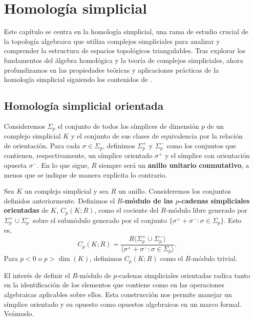 
\chapter{Homología simplicial}

Este capítulo se centra en la homología simplicial, una rama de estudio crucial
de la topología algebraica que utiliza complejos simpliciales para analizar y
comprender la estructura de espacios topológicos triangulables. Tras explorar los
fundamentos del álgebra homológica y la teoría de complejos simpliciales, ahora
profundizamos en las propiedades teóricas y aplicaciones prácticas de la
homología simplicial siguiendo los contenidos de \cite{rafael2003elementos}.

\section{Homología simplicial orientada}
Consideremos \(\Sigma_{p}\) el conjunto de todos los símplices de dimensión \(p\) de
un complejo simplicial \(K\) y el conjunto de sus clases de equivalencia por la relación de orientación. Para cada \(\sigma \in \Sigma_{p}\), definimos
\(\Sigma_{p}^{+}\) y \(\Sigma_{p}^{-}\) como los conjuntos que contienen, respectivamente,
un símplice orientado \(\sigma^{+}\) y el símplice con orientación opuesta
\(\sigma^{-}\). En lo que sigue, \(R\) siempre será un \textbf{anillo unitario conmutativo}, a menos que se indique de manera explícita lo contrario.

\begin{definicion}
	Sea \(K\) un complejo simplicial y sea \(R\) un anillo. Consideremos los conjuntos definidos anteriormente. Definimos el \textbf{\(R\)-módulo de las \(p\)-cadenas simpliciales orientadas}
	de \(K\), \(C_{p}(K;R)\), como el cociente del \(R\)-módulo libre generado por
	\(\Sigma_{p}^{+}\cup \Sigma_{p}^{-}\) sobre el submódulo generado por el
	conjunto \(\{\sigma^{+}+ \sigma^{-}: \sigma \in \Sigma_{p}\}\). Esto es,
	\[
	C_{p}(K;R) = \frac{R\langle \Sigma_{p}^{+}\cup \Sigma_{p}^{-}\rangle}{\langle
		\sigma^{+}+ \sigma^{-}: \sigma \in \Sigma_{p}\rangle}.
	\]
	Para \(p < 0\) o \(p > \dim(K)\), definimos \(C_{p}(K;R)\) como el \(R\)-módulo trivial.
\end{definicion}
El interés de definir el \(R\)-módulo de \(p\)-cadenas simpliciales orientadas radica
tanto en la identificación de los elementos que contiene como en las operaciones
algebraicas aplicables sobre ellos. Esta construcción nos permite manejar un
símplice orientado y su opuesto como opuestos algebraicos en un marco formal. Veámoslo.

